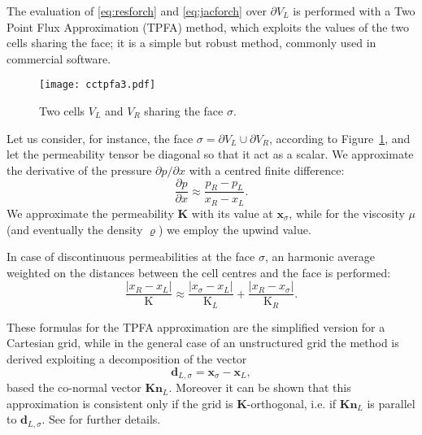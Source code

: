 The evaluation of \eqref{eq:resforch} and \eqref{eq:jacforch} over $\partial 
V_L$ is performed with a Two Point Flux Approximation (TPFA) method, which 
exploits the values of the two cells sharing the face; it is a 
simple but robust method, commonly used in commercial software.
\begin{figure}
	\centering
	\texttt{[image: cctpfa3.pdf]}
	\caption[Two cells $V_L$ and $V_R$ sharing the face $\sigma$]{Two cells 
	$V_L$ and $V_R$ sharing the face $\sigma$.}
	\label{fig:cctpfa}
\end{figure}
Let us consider, for instance, the face $\sigma = \partial V_L \cup \partial 
V_R$, according to Figure~\ref{fig:cctpfa}, and let the permeability tensor be 
diagonal so that it act as a scalar. We approximate the derivative of the 
pressure $\partial p /\partial 
x$ with a centred finite difference:
\begin{equation}
\frac{\partial p}{\partial x} \approx \frac{p_R-p_L}{x_R -x_L}.
\end{equation}
We approximate the permeability $\mathbf{K}$ with its value at 
$\mathbf{x}_\sigma$, while 
for the viscosity $\mu$ (and eventually the density $\varrho$) we employ the 
upwind value.

In case of discontinuous permeabilities at the face $\sigma$, an harmonic 
average weighted on the distances between the cell centres and the face is 
performed:
\begin{equation}
\frac{|x_R - x_L|}{\mathrm{K}} \approx 
\frac{|x_\sigma - x_L|}{\mathrm{K}_L}+\frac{|x_R - x_\sigma|}{\mathrm{K}_R}.
\end{equation}

These formulas for the TPFA approximation are the simplified version for a 
Cartesian grid, while in the general case of an unstructured grid the method is 
derived exploiting a decomposition of the vector
\begin{equation}
\mathbf{d}_{L,\sigma}=\mathbf{x}_\sigma - \mathbf{x}_L,
\end{equation}
based the co-normal vector $\mathbf{Kn}_L$. Moreover it 
can be shown that this approximation is consistent only if the grid is 
$\mathbf{K}$-orthogonal, i.e. if $\mathbf{Kn}_L$ is parallel to $\mathbf{d}_{L, \sigma}$. 
See \cite{tesi:wolff} for further details.
%
